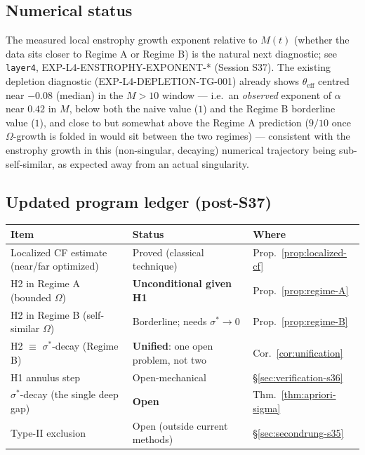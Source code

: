 \documentclass[11pt]{article}
\theoremstyle{definition}
\theoremstyle{remark}
\begin{document}
\subsection{Numerical status}

The measured local enstrophy growth exponent relative to $M(t)$ (whether
the data sits closer to Regime A or Regime B) is the natural next
diagnostic; see \texttt{layer4}, EXP-L4-ENSTROPHY-EXPONENT-* (Session S37).
The existing depletion diagnostic (EXP-L4-DEPLETION-TG-001) already shows
$\theta_{\mathrm{eff}}$ centred near $-0.08$ (median) in the $M>10$ window
--- i.e.\ an \emph{observed} exponent of $\alpha$ near $0.42$ in $M$,
below both the naive value ($1$) and the Regime B borderline value ($1$),
and close to but somewhat above the Regime A prediction ($9/10$ once
$\Omega$-growth is folded in would sit between the two regimes) ---
consistent with the enstrophy growth in this (non-singular, decaying)
numerical trajectory being sub-self-similar, as expected away from an
actual singularity.

\subsection{Updated program ledger (post-S37)}

\begin{center}
\begin{tabular}{lll}
\hline
Item & Status & Where \\
\hline
Localized CF estimate (near/far optimized) & Proved (classical technique) & Prop.~\ref{prop:localized-cf} \\
H2 in Regime A (bounded $\Omega$) & \textbf{Unconditional given H1} & Prop.~\ref{prop:regime-A} \\
H2 in Regime B (self-similar $\Omega$) & Borderline; needs $\sigma^*\to 0$ & Prop.~\ref{prop:regime-B} \\
H2 $\equiv$ $\sigma^*$-decay (Regime B) & \textbf{Unified}: one open problem, not two & Cor.~\ref{cor:unification} \\
H1 annulus step & Open-mechanical & \S\ref{sec:verification-s36} \\
$\sigma^*$-decay (the single deep gap) & \textbf{Open} & Thm.~\ref{thm:apriori-sigma} \\
Type-II exclusion & Open (outside current methods) & \S\ref{sec:secondrung-s35} \\
\hline
\end{tabular}
\end{center}
\end{document}
